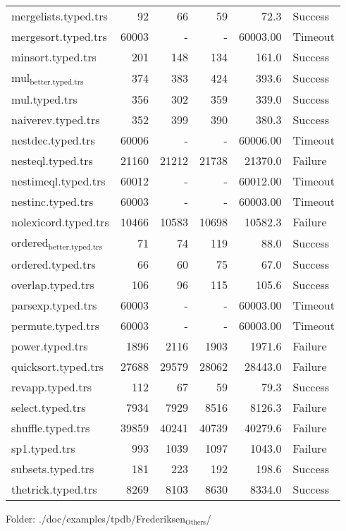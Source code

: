 \documentclass[11pt]{article}
\begin{document}
\begin{center}
\begin{tabular}{lrrrrl}
mergelists.typed.trs & 92 & 66 & 59 & 72.3 & Success\\
mergesort.typed.trs & 60003 & - & - & 60003.00 & Timeout\\
minsort.typed.trs & 201 & 148 & 134 & 161.0 & Success\\
mul\(_{\text{better.typed.trs}}\) & 374 & 383 & 424 & 393.6 & Success\\
mul.typed.trs & 356 & 302 & 359 & 339.0 & Success\\
naiverev.typed.trs & 352 & 399 & 390 & 380.3 & Success\\
nestdec.typed.trs & 60006 & - & - & 60006.00 & Timeout\\
nesteql.typed.trs & 21160 & 21212 & 21738 & 21370.0 & Failure\\
nestimeql.typed.trs & 60012 & - & - & 60012.00 & Timeout\\
nestinc.typed.trs & 60003 & - & - & 60003.00 & Timeout\\
nolexicord.typed.trs & 10466 & 10583 & 10698 & 10582.3 & Failure\\
ordered\(_{\text{better.typed.trs}}\) & 71 & 74 & 119 & 88.0 & Success\\
ordered.typed.trs & 66 & 60 & 75 & 67.0 & Success\\
overlap.typed.trs & 106 & 96 & 115 & 105.6 & Success\\
parsexp.typed.trs & 60003 & - & - & 60003.00 & Timeout\\
permute.typed.trs & 60003 & - & - & 60003.00 & Timeout\\
power.typed.trs & 1896 & 2116 & 1903 & 1971.6 & Failure\\
quicksort.typed.trs & 27688 & 29579 & 28062 & 28443.0 & Failure\\
revapp.typed.trs & 112 & 67 & 59 & 79.3 & Success\\
select.typed.trs & 7934 & 7929 & 8516 & 8126.3 & Failure\\
shuffle.typed.trs & 39859 & 40241 & 40739 & 40279.6 & Failure\\
sp1.typed.trs & 993 & 1039 & 1097 & 1043.0 & Failure\\
subsets.typed.trs & 181 & 223 & 192 & 198.6 & Success\\
thetrick.typed.trs & 8269 & 8103 & 8630 & 8334.0 & Success\\
\end{tabular}

\end{center}


Folder: ./doc/examples/tpdb/Frederiksen\(_{\text{Others}}\)/
\end{document}
